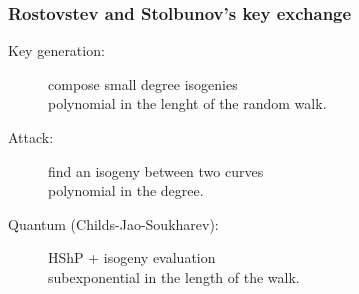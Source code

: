 \documentclass{beamer}
\begin{document}

\begin{frame}
  \frametitle{Rostovstev and Stolbunov's key exchange}

  \begin{center}
  \end{center}

  \begin{description}
  \item[Key generation:] compose small degree
    isogenies\\\alert{polynomial in the lenght of the random walk}.
  \item[Attack:] find an isogeny between two curves\\\alert{polynomial
      in the degree}.
  \item[Quantum (Childs-Jao-Soukharev):] HShP + isogeny
    evaluation\\\alert{subexponential in the length of the walk}.
  \end{description}
\end{frame}

\end{document}
